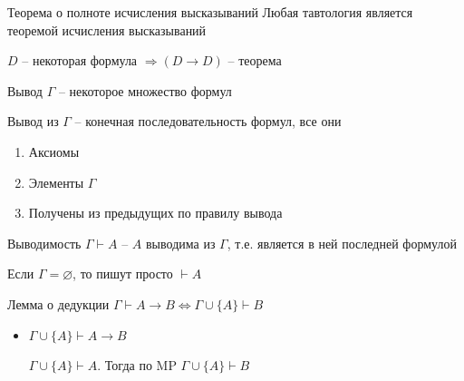 \documentclass[12pt]{article}
\begin{document}
\begin{theo}{Теорема о полноте исчисления высказываний}
    Любая тавтология является теоремой исчисления высказываний
\end{theo}

\begin{lem}{}
    $D$ -- некоторая формула $\Rightarrow (D \to D)$ -- теорема
\end{lem}

\begin{defin}{Вывод}
    $\Gamma$ -- некоторое множество формул

    Вывод из $\Gamma$ -- конечная последовательность формул, все они 

    \begin{enumerate}
        \item Аксиомы
        \item Элементы $\Gamma$
        \item Получены из предыдущих по правилу вывода
    \end{enumerate}
\end{defin}

\begin{defin}{Выводимость}
    $\Gamma \vdash A$ -- $A$ выводима из $\Gamma$, т.е. является в ней последней формулой

    Если $\Gamma = \varnothing$, то пишут просто $\vdash A$
\end{defin}

\begin{lem}{Лемма о дедукции}
    $\Gamma \vdash A \to B \Leftrightarrow \Gamma \cup \{A\} \vdash B$
\end{lem}

\begin{Proof}{}

\begin{itemize}
    \item[$\Rightarrow$] $\Gamma \cup \{A\} \vdash A \to B$
    
    $\Gamma \cup \{A\} \vdash A$. Тогда по MP $\Gamma \cup \{A\} \vdash B$
\end{itemize}

\end{Proof}
\end{document}
